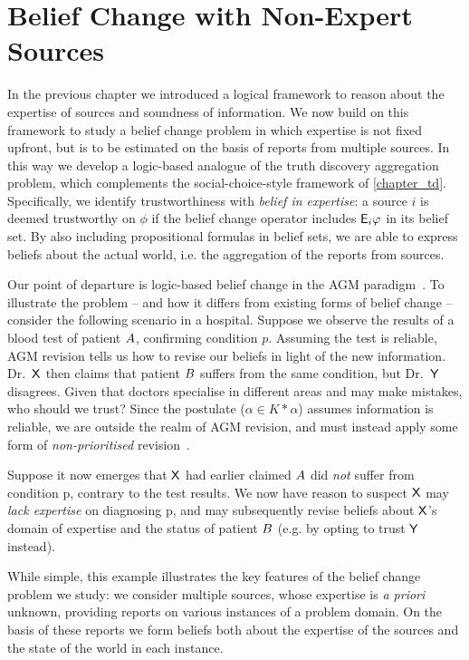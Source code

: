 \chapter{Belief Change with Non-Expert Sources}
\label{chapter_belief_change}

In the previous chapter we introduced a logical framework to reason about the
expertise of sources and soundness of information. We now build on this
framework to study a belief change problem in which expertise is not fixed
upfront, but is to be estimated on the basis of reports from multiple sources.
In this way we develop a logic-based analogue of the truth discovery
aggregation problem, which complements the social-choice-style framework of
\cref{chapter_td}. Specifically, we identify trustworthiness with \emph{belief
in expertise}: a source $i$ is deemed trustworthy on $\phi$ if the belief
change operator includes $\mathsf{E}_i\varphi$ in its belief set. By also including
propositional formulas in belief sets, we are able to express beliefs about the
actual world, i.e. the aggregation of the reports from sources.

Our point of departure is logic-based belief change in the AGM
paradigm~\cite{alchourron1985logic}.  To illustrate the problem -- and how it
differs from existing forms of belief change -- consider the following scenario
in a hospital. Suppose we observe the results of a blood test of patient $A$,
confirming condition $p$. Assuming the test is reliable, AGM revision tells us
how to revise our beliefs in light of the new information. Dr.\ $\mathsf{X}$ then claims
that patient $B$ suffers from the same condition, but Dr.\ $\mathsf{Y}$ disagrees. Given
that doctors specialise in different areas and may make mistakes, who should we
trust?
%
Since the  postulate ($\alpha \in K \ast \alpha$) assumes
information is reliable, we are outside the realm of AGM revision, and must
instead apply some form of \emph{non-prioritised}
revision~\cite{hansson1999survey}.

Suppose it now emerges that $\mathsf{X}$ had earlier claimed $A$ did \emph{not}
suffer from condition p, contrary to the test results. We now have reason to
suspect $\mathsf{X}$ may \emph{lack expertise} on diagnosing p, and may subsequently
revise beliefs about $\mathsf{X}$'s domain of expertise and the status of patient
$B$ (e.g. by opting to trust $\mathsf{Y}$ instead).

While simple, this example illustrates the key features of the belief change
problem we study: we consider multiple sources, whose expertise is \emph{a
priori} unknown, providing reports on various instances of a problem domain. On
the basis of these reports we form beliefs both about the expertise of the
sources and the state of the world in each instance.

